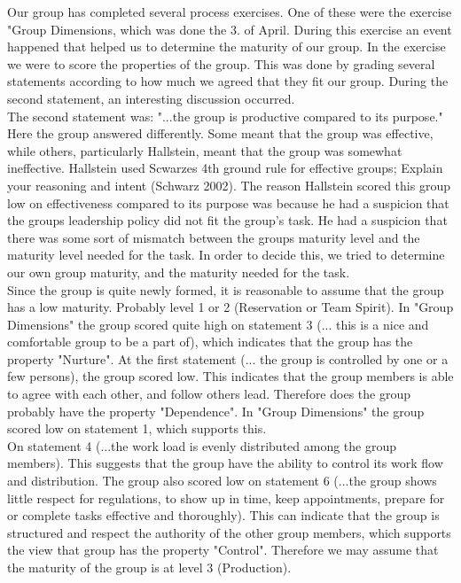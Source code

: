 Our group has completed several process exercises. One of these were the exercise "Group Dimensions, which was done the 3. of April. During this exercise an event happened that helped us to determine the  maturity of our group. In the exercise we were to score 
the properties of the group. This was done by grading several statements according to how much we agreed that they fit our group. During the second statement, an interesting discussion occurred.  
\\
The second statement was: "...the group is productive compared to its purpose." Here the group answered differently. Some meant that the group was effective, while others, particularly Hallstein, meant that the group was somewhat ineffective. Hallstein used Scwarzes 4th ground rule for effective groups; Explain your reasoning and intent (Schwarz 2002). The reason Hallstein scored this group low on effectiveness compared to its purpose was because he had a suspicion that the groups leadership policy did not fit the group's task. He had a suspicion that there was some sort of mismatch between the groups maturity level and the maturity level needed for the task. In order to decide this, we tried to determine our own group maturity, and the maturity needed for the task.  
\\
Since the group is quite newly formed, it is reasonable to assume that the group has a low maturity. Probably level 1 or 2 (Reservation or Team Spirit). In "Group Dimensions" the group scored quite high on statement 3 (... this is a nice and comfortable group to be a part of), which indicates that the group has the property "Nurture". At the first statement (... the group is controlled by one or a few persons), the group scored low. This indicates that the group members is able to agree with each other, and follow others lead. Therefore does the group probably have the property "Dependence". In "Group Dimensions" the group scored low on statement 1, which supports this. 
\\
On statement 4 (...the work load is evenly distributed among the group members). This suggests that the group have the ability to control its work flow and distribution. The group also scored low on statement 6 (...the group shows little respect for regulations, to show up in time, keep appointments, prepare for or complete tasks effective and thoroughly). This can indicate that the group is structured and respect the authority of the other group members, which supports the view that group has the property "Control". Therefore we may assume that the maturity of the group is at level 3 (Production).
